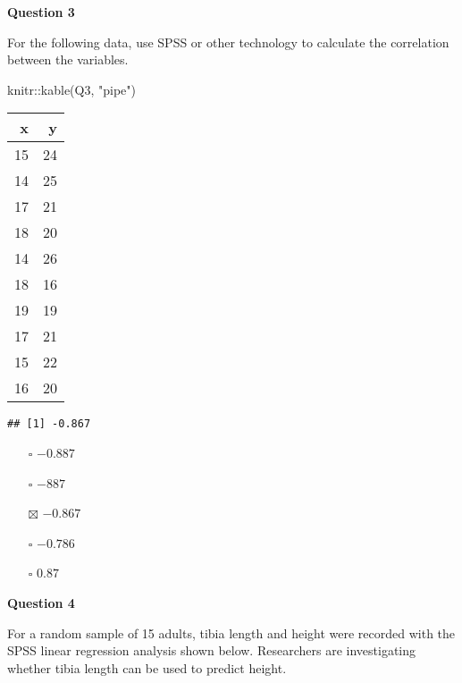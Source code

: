 \documentclass[
]{article}
\newenvironment{Shaded}{\begin{snugshade}}{\end{snugshade}}
\newcommand{\DecValTok}[1]{\textcolor[rgb]{0.00,0.00,0.81}{#1}}
\newcommand{\FunctionTok}[1]{\textcolor[rgb]{0.00,0.00,0.00}{#1}}
\newcommand{\NormalTok}[1]{#1}
\newcommand{\SpecialCharTok}[1]{\textcolor[rgb]{0.00,0.00,0.00}{#1}}
\newcommand{\StringTok}[1]{\textcolor[rgb]{0.31,0.60,0.02}{#1}}
\providecommand{\tightlist}{%
  \setlength{\itemsep}{0pt}\setlength{\parskip}{0pt}}
\begin{document}
\textbf{Question 3}

For the following data, use SPSS or other technology to calculate the
correlation between the variables.

\begin{Shaded}
\begin{Highlighting}[]
\NormalTok{knitr}\SpecialCharTok{::}\FunctionTok{kable}\NormalTok{(Q3, }\StringTok{"pipe"}\NormalTok{)}
\end{Highlighting}
\end{Shaded}

\begin{longtable}[]{@{}rr@{}}
\toprule
x & y \\
\midrule
\endhead
15 & 24 \\
14 & 25 \\
17 & 21 \\
18 & 20 \\
14 & 26 \\
18 & 16 \\
19 & 19 \\
17 & 21 \\
15 & 22 \\
16 & 20 \\
\bottomrule
\end{longtable}

\begin{Shaded}
\end{Shaded}

\begin{verbatim}
## [1] -0.867
\end{verbatim}

\begin{itemize}
\tightlist
\item[$\square$]
  \(-0.887\)
\item[$\square$]
  \(-887\)
\item[$\boxtimes$]
  \(-0.867\)
\item[$\square$]
  \(-0.786\)
\item[$\square$]
  \(0.87\)
\end{itemize}

\textbf{Question 4}

For a random sample of 15 adults, tibia length and height were recorded
with the SPSS linear regression analysis shown below. Researchers are
investigating whether tibia length can be used to predict height.
\end{document}

